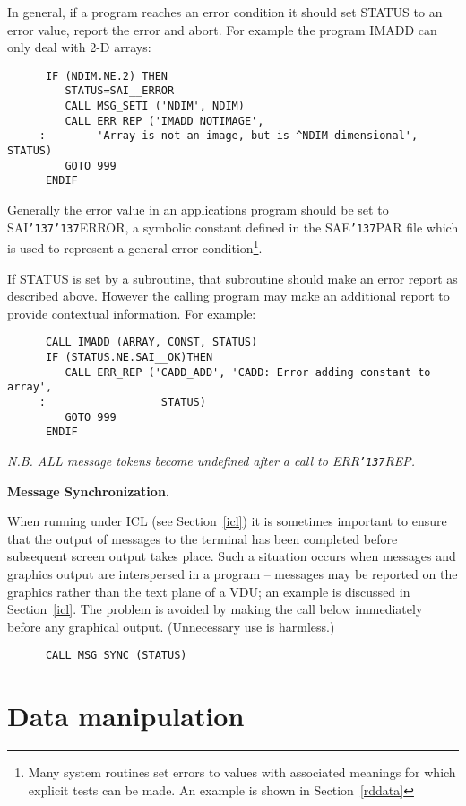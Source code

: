 \documentclass[twoside,11pt]{article}
\renewcommand{\_}{{\tt\char'137}}
\newcommand{\xlabel}[1]{}
\begin{document}
In general, if a program reaches an error condition it should set STATUS
to  an error value, report the error and abort.
For example the program IMADD can only deal with 2-D arrays:
\begin{verbatim}
      IF (NDIM.NE.2) THEN
         STATUS=SAI__ERROR
         CALL MSG_SETI ('NDIM', NDIM)
         CALL ERR_REP ('IMADD_NOTIMAGE',
     :        'Array is not an image, but is ^NDIM-dimensional', STATUS)
         GOTO 999
      ENDIF
\end{verbatim}
Generally the error value in an applications program should be set 
to SAI\_\_ERROR, a symbolic 
constant defined in the SAE\_PAR file which is used to represent a general
error condition\footnote{Many system routines set errors to 
values with associated meanings for which explicit
tests can be made. An example is shown in Section~\ref{rddata}}.

If STATUS is set by a subroutine, that subroutine should make an error report 
as described above. However the calling program may make an additional 
report to provide contextual information.
For example:
\begin{verbatim}
      CALL IMADD (ARRAY, CONST, STATUS)
      IF (STATUS.NE.SAI__OK)THEN
         CALL ERR_REP ('CADD_ADD', 'CADD: Error adding constant to array',
     :                  STATUS)
         GOTO 999
      ENDIF
\end{verbatim}
{\sl N.B. ALL message tokens become undefined after a call to ERR\_REP.}

{\bigskip\large\bf Message Synchronization.}

When running under ICL (see Section~\ref{icl}) it is sometimes important
to ensure that the output of messages to the terminal has been completed
before subsequent screen output takes place.
Such a situation occurs when messages and graphics output are interspersed 
in a program -- 
messages may be reported on the graphics rather than the text plane of a VDU;
an example is discussed in Section~\ref{icl}.
The problem is avoided by making the call below immediately before any
graphical output. (Unnecessary use is harmless.)
\begin{verbatim}
      CALL MSG_SYNC (STATUS)
\end{verbatim}

\newpage
\section{Data manipulation\label{add7}\xlabel{data_manipulation}}
\end{document}
